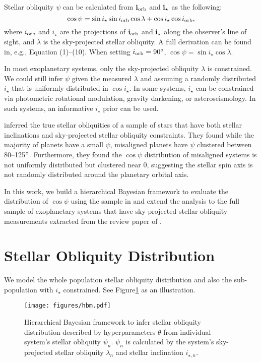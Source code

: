 \documentclass[twocolumn]{aastex631}
\begin{document}
Stellar obliquity $\psi$ can be calculated from $\bf{i}_{\rm orb}$ and $\bf{i}_{\star}$ as the following:
\begin{equation}
    \cos{\psi} = \sin{i_\star}\sin{i_{\rm orb}}\cos{\lambda} + \cos{i_\star}\cos{i_{\rm orb}},
\end{equation}
where $i_{\rm orb}$ and $i_\star$ are the projections of $\bf{i}_{\rm orb}$ and $\bf{i}_{\star}$ along the observer's line of sight, and $\lambda$ is the sky-projected stellar obliquity. A full derivation can be found in, e.g., \cite{Fabrycky09} Equation (1)--(10).
When setting $i_{\rm orb} = 90\mbox{$^\circ$}$, $\cos{\psi} = \sin{i_\star}\cos{\lambda}$.

In most exoplanetary systems, only the sky-projected obliquity $\lambda$ is constrained. We could still infer $\psi$ given the measured $\lambda$ and assuming a randomly distributed $i_\star$ that is uniformly distributed in $\cos{i_\star}$.
In some systems, $i_\star$ can be constrained via photometric rotational modulation, gravity darkening, or asteroseismology. In such systems, an informative $i_\star$ prior can be used.

\cite{Albrecht21} inferred the true stellar obliquities of a sample of stars that have both stellar inclinations and sky-projected stellar obliquity constraints. They found while the majority of planets have a small $\psi$, misaligned planets have $\psi$ clustered between 80--125$\mbox{$^\circ$}$. Furthermore, they found the $\cos{\psi}$ distribution of misaligned systems is not uniformly distributed but clustered near 0, suggesting the stellar spin axis is not randomly distributed around the planetary orbital axis.

In this work, we build a hierarchical Bayesian framework to evaluate the distribution of $\cos{\psi}$ using the sample in \cite{Albrecht21} and extend the analysis to the full sample of exoplanetary systems that have sky-projected stellar obliquity measurements extracted from the review paper of \cite{Albrecht22}.

\section{Stellar Obliquity Distribution} \label{sec:hbm}
We model the whole population stellar obliquity distribution and also the sub-population with $i_\star$ constrained. See Figure\ref{fig:hbm} as an illustration. 

\begin{figure}[ht!]
    \texttt{[image: figures/hbm.pdf]}
    \caption{Hierarchical Bayesian framework to infer stellar obliquity distribution described by hyperparameters $\theta$ from individual system's stellar obliquity $\psi_n$. $\psi_n$ is calculated by the system's sky-projected stellar obliquity $\lambda_n$ and stellar inclination $i_{\star, n}$.}
    \label{fig:hbm}
\end{figure}
\end{document}
